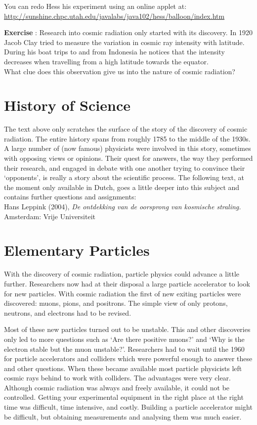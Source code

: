 \documentclass[12pt,a4paper]{article}
\numberwithin{equation}{section}
\numberwithin{figure}{section}
\newcounter{Exercise}
\numberwithin{table}{section}
\begin{document}
You can redo Hess his experiment using an online applet at: \\
\url{http://sunshine.chpc.utah.edu/javalabs/java102/hess/balloon/index.htm}

\begin{shaded}
\textbf{Exercise \theExercise {}} : Research into cosmic radiation only started with its discovery. In 1920 Jacob Clay tried to measure the variation in cosmic ray intensity with latitude. During his boat trips to and from Indonesia he notices that the intensity decreases when travelling from a high latitude towards the equator.\\
What clue does this observation give us into the nature of cosmic radiation? \end{shaded}

\section{History of Science}
The text above only scratches the surface of the story of the discovery of cosmic radiation. The entire history spans from roughly 1785 to the middle of the 1930s. A large number of (now famous) physicists were involved in this story, sometimes with opposing views or opinions. Their quest for answers, the way they performed their research, and engaged in debate with one another trying to convince their `opponents', is really a story about the scientific process. The following text, at the moment only available in Dutch, goes a little deeper into this subject and contains further questions and assignments:\\
Hans Leppink (2004), \textit{De ontdekking van de oorsprong van kosmische straling.} Amsterdam: Vrije Universiteit

\section{Elementary Particles}
With the discovery of cosmic radiation, particle physics could advance a little further. Researchers now had at their disposal a large particle accelerator to look for new particles. With cosmic radiation the first of new exiting particles were discovered: muons, pions, and  positrons. The simple view of only protons, neutrons, and electrons had to be revised. 

Most of these new particles turned out to be unstable. This and other discoveries only led to more questions such as `Are there positive muons?' and `Why is the electron stable but the muon unstable?'. Researchers had to wait until the 1960 for particle accelerators and colliders which were powerful enough to answer these and other questions. When these became available most particle physicists left cosmic rays behind to work with colliders. The advantages were very clear. Although cosmic radiation was always and freely available, it could not be controlled. Getting your experimental equipment in the right place at the right time was difficult, time intensive, and costly. Building a particle accelerator might be difficult, but obtaining measurements and analysing them was much easier.
\end{document}
